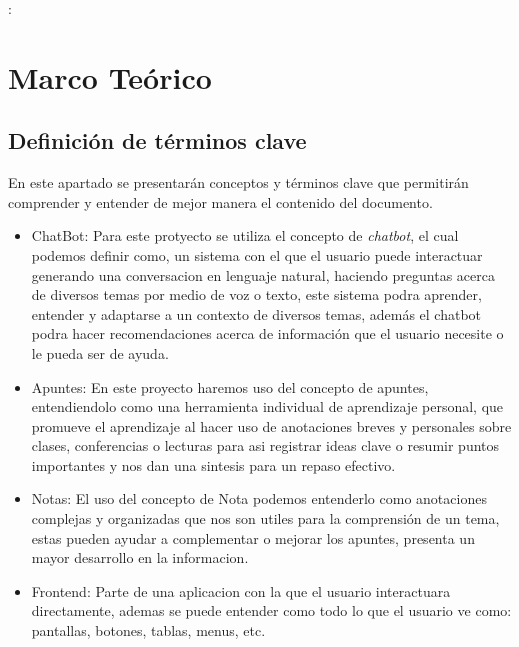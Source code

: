 :\chapter{Marco Teórico}
\thispagestyle{fancy}
\section{Definición de términos clave}
\noindent En este apartado se presentarán conceptos y términos clave que permitirán comprender y entender de mejor manera el contenido del documento.
\begin{itemize}

\item ChatBot: Para este protyecto se utiliza el concepto de \textit{chatbot}, el cual podemos definir como, un sistema con el que el usuario puede interactuar generando una conversacion en lenguaje natural, haciendo preguntas acerca de diversos temas por medio de voz o texto, este sistema podra aprender, entender y adaptarse a un contexto de diversos temas, además el chatbot podra hacer recomendaciones acerca de información que el usuario necesite o le pueda ser de ayuda\cite{chatbot_AWS,chatbot_IBM}.

\item Apuntes: En este proyecto haremos uso del concepto de apuntes, entendiendolo como una herramienta individual de aprendizaje personal, que promueve el aprendizaje al hacer uso de anotaciones breves y personales sobre clases, conferencias o lecturas para asi registrar ideas clave o resumir puntos importantes y nos dan una sintesis para un repaso efectivo\cite{Apuntes}. 

\item Notas: El uso del concepto de Nota podemos entenderlo como anotaciones complejas y organizadas que nos son utiles para la comprensión de un tema, estas pueden ayudar a complementar o mejorar los apuntes, presenta un mayor desarrollo en la informacion\cite{nota}. 

\item Frontend: Parte de una aplicacion con la que el usuario interactuara directamente, ademas se puede entender como todo lo que el usuario ve como: pantallas, botones, tablas, menus, etc\cite{frontend}.  

\end{itemize}

